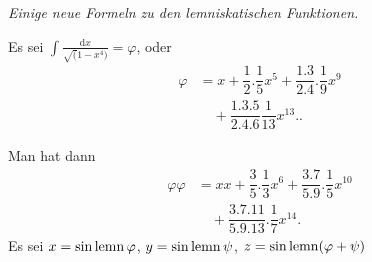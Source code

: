 \begingroup
\renewcommand{\arraystretch}{1.45}
\clearpage{}
\par{}\begin{center}\textit{Einige neue Formeln zu den lemniskatischen Funktionen.}\end{center}
Es sei $\displaystyle\int\frac{\mathrm{d}x}{\surd(1-x^4)}=\varphi$, oder
\[
\begin{aligned}\varphi&=x+\dfrac12.\dfrac15x^5+\dfrac{1.3}{2.4}.\dfrac19x^9\\[6pt]&\quad{}+\dfrac{1.3.5}{2.4.6}\dfrac1{13}x^{13}\mathord{.}\mathord{.}\end{aligned}
\]

Man hat dann
\[
\begin{aligned}\varphi\varphi&=xx+\dfrac35.\dfrac13x^6+\dfrac{3.7}{5.9}.\dfrac15x^{10}\\[6pt]&\quad{}+\dfrac{3.7.11}{5.9.13}.\dfrac17x^{14}.\end{aligned}
\]
Es sei $x=\operatorname{sin\,lemn}\varphi$, $y=\operatorname{sin\,lemn}\psi$, $z=\operatorname{sin\,lemn}(\varphi+\psi)$

